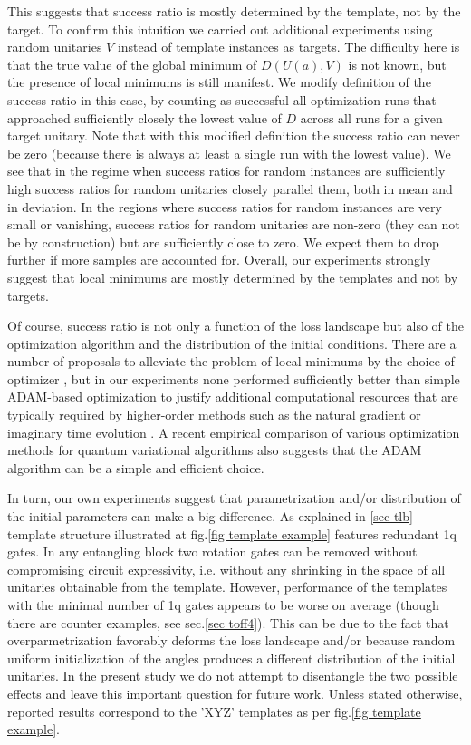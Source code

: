 \documentclass[amsfonts, amssymb, aps, nofootinbib, twocolumn]{revtex4-2}
\begin{document}
This suggests that success ratio is mostly determined by the template, not by the target. To confirm this  intuition  we carried out additional experiments using random unitaries $V$ instead of template instances as targets. The difficulty here is that the true value of the global minimum of $D(U(a), V)$ is not known, but the presence of local minimums is still manifest. We modify definition of the success ratio in this case, by counting as successful all optimization runs that approached sufficiently closely the lowest value of $D$ across all runs for a given target unitary. Note that with this modified definition the success ratio can never be zero (because there is always at least a single run with the lowest value). We see that in the regime when success ratios for random instances are sufficiently high success ratios for random unitaries closely parallel them, both in mean and in deviation. In the regions where success ratios for random instances are very small or vanishing, success ratios for random unitaries are non-zero (they can not be by construction) but are sufficiently close to zero. We expect them to drop further if more samples are accounted for. Overall, our experiments strongly suggest that local minimums are mostly determined by the templates and not by targets.

Of course, success ratio is not only a function of the loss landscape but also of the optimization algorithm and the distribution of the initial conditions. There are a number of proposals to alleviate the problem of local minimums by the choice of optimizer \cite{Wierichs2020, Rivera-Dean2021}, but in our experiments none performed sufficiently better than simple ADAM\cite{adam}-based optimization to justify additional computational resources that are typically required by higher-order methods such as the natural gradient \cite{Stokes2020} or imaginary time evolution \cite{Jones2018a}. A recent empirical comparison of various optimization methods for quantum variational algorithms \cite{Lockwood2022} also suggests that the ADAM algorithm can be a simple and efficient choice.

In turn, our own experiments suggest that parametrization and/or distribution of the initial parameters can make a big difference. As explained in \ref{sec tlb} template structure illustrated at fig.\ref{fig template example} features redundant 1q gates. In any entangling block two rotation gates can be removed without compromising circuit expressivity, i.e. without any shrinking in the space of all unitaries obtainable from the template. However, performance of the templates with the minimal number of 1q gates appears to be worse on average (though there are counter examples, see sec.\ref{sec toff4}). This can be due to the fact that overparmetrization favorably deforms the loss landscape and/or because random uniform initialization of the angles produces a different distribution of the initial unitaries. In the present study we do not attempt to disentangle the two possible effects and leave this important question for future work. Unless stated otherwise, reported results correspond to the 'XYZ' templates as per fig.\ref{fig template example}.
\end{document}

